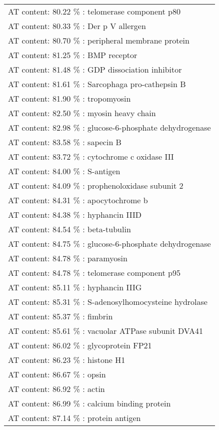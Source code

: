 \begin{table}
\begin{tiny}
\begin{center}
\begin{tabular}{|l|}
\hline
 AT content: 80.22 \% : telomerase component p80
\\ AT content: 80.33 \% : Der p V allergen
\\ AT content: 80.70 \% : peripheral membrane protein
\\ AT content: 81.25 \% : BMP receptor
\\ AT content: 81.48 \% : GDP dissociation inhibitor
\\ AT content: 81.61 \% : Sarcophaga pro-cathepsin B
\\ AT content: 81.90 \% : tropomyosin
\\ AT content: 82.50 \% : myosin heavy chain
\\ AT content: 82.98 \% : glucose-6-phosphate dehydrogenase
\\ AT content: 83.58 \% : sapecin B
\\ AT content: 83.72 \% : cytochrome c oxidase III
\\ AT content: 84.00 \% : S-antigen
\\ AT content: 84.09 \% : prophenoloxidase subunit 2
\\ AT content: 84.31 \% : apocytochrome b
\\ AT content: 84.38 \% : hyphancin IIID
\\ AT content: 84.54 \% : beta-tubulin
\\ AT content: 84.75 \% : glucose-6-phosphate dehydrogenase
\\ AT content: 84.78 \% : paramyosin
\\ AT content: 84.78 \% : telomerase component p95
\\ AT content: 85.11 \% : hyphancin IIIG
\\ AT content: 85.31 \% : S-adenosylhomocysteine hydrolase
\\ AT content: 85.37 \% : fimbrin
\\ AT content: 85.61 \% : vacuolar ATPase subunit DVA41
\\ AT content: 86.02 \% : glycoprotein FP21
\\ AT content: 86.23 \% : histone H1
\\ AT content: 86.67 \% : opsin
\\ AT content: 86.92 \% : actin
\\ AT content: 86.99 \% : calcium binding protein
\\ AT content: 87.14 \% : protein antigen

\end{tabular}
\end{center}
\end{tiny}
\end{table}
